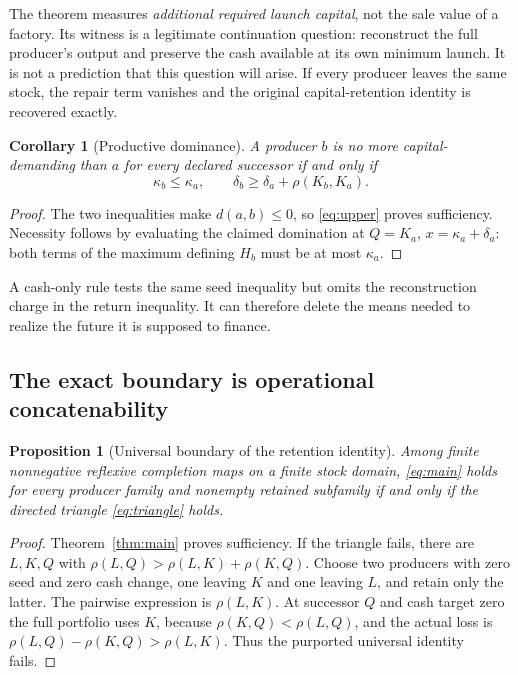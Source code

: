 \documentclass[11pt,letterpaper]{article}
\newtheorem{proposition}[theorem]{Proposition}
\newtheorem{corollary}[theorem]{Corollary}
\theoremstyle{definition}\newtheorem{definition}[theorem]{Definition}
\theoremstyle{remark}\newtheorem{remark}[theorem]{Remark}
\begin{document}
The theorem measures \emph{additional required launch capital}, not the sale value of a factory. Its witness is a legitimate continuation question: reconstruct the full producer's output and preserve the cash available at its own minimum launch. It is not a prediction that this question will arise. If every producer leaves the same stock, the repair term vanishes and the original capital-retention identity is recovered exactly.

\begin{corollary}[Productive dominance]
\label{cor:dominance}
A producer $b$ is no more capital-demanding than $a$ for every declared successor if and only if
\begin{equation}
 \kappa_b\le\kappa_a,\qquad
 \delta_b\ge\delta_a+\rho(K_b,K_a).
 \label{eq:dominance}
\end{equation}
\end{corollary}
\begin{proof}
The two inequalities make $d(a,b)\le0$, so \eqref{eq:upper} proves sufficiency. Necessity follows by evaluating the claimed domination at $Q=K_a$, $x=\kappa_a+\delta_a$: both terms of the maximum defining $H_b$ must be at most $\kappa_a$.
\end{proof}

A cash-only rule tests the same seed inequality but omits the reconstruction charge in the return inequality. It can therefore delete the means needed to realize the future it is supposed to finance.

\subsection{The exact boundary is operational concatenability}
\begin{proposition}[Universal boundary of the retention identity]
\label{prop:boundary}
Among finite nonnegative reflexive completion maps on a finite stock domain, \eqref{eq:main} holds for every producer family and nonempty retained subfamily if and only if the directed triangle \eqref{eq:triangle} holds.
\end{proposition}
\begin{proof}
Theorem~\ref{thm:main} proves sufficiency. If the triangle fails, there are $L,K,Q$ with
$\rho(L,Q)>\rho(L,K)+\rho(K,Q)$. Choose two producers with zero seed and zero cash change, one leaving $K$ and one leaving $L$, and retain only the latter. The pairwise expression is $\rho(L,K)$. At successor $Q$ and cash target zero the full portfolio uses $K$, because $\rho(K,Q)<\rho(L,Q)$, and the actual loss is $\rho(L,Q)-\rho(K,Q)>\rho(L,K)$. Thus the purported universal identity fails.
\end{proof}
\end{document}
